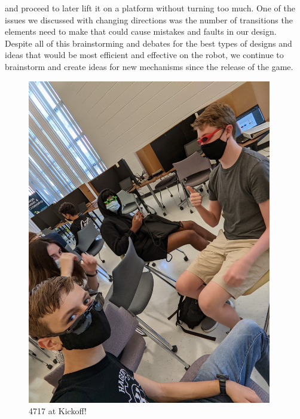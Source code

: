 and proceed to later lift it on a platform without turning too much. One of the issues we discussed with changing directions was the number of transitions the elements need to make that could cause mistakes and faults in our design. Despite all of this brainstorming and debates for the best types of designs and ideas that would be most efficient and effective on the robot, we continue to brainstorm and create ideas for new mechanisms since the release of the game. 
 

\begin{figure}[ht]
\centering
\begin{minipage}[b]{.48\textwidth}
  \centering
  \includegraphics[width=0.95\textwidth]{Meetings/September/09-18-21/PXL_20210918_151448302 - Jensen Miller.jpg}
  \caption{4717 at Kickoff!}
  \label{fig:pic1}
\end{minipage}%
\hfill%
\begin{minipage}[b]{.48\textwidth}
  \centering

\end{minipage}
\end{figure}

